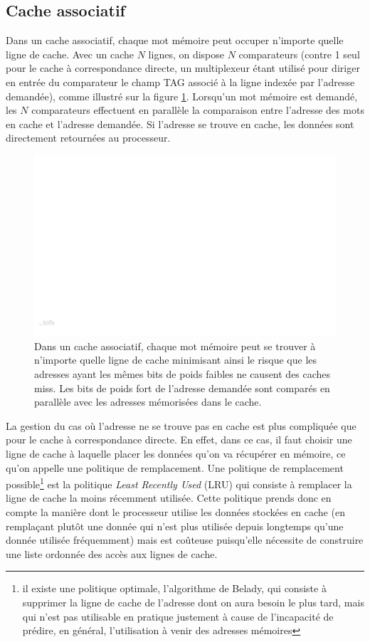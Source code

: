 \subsection{Cache associatif}

Dans un cache associatif, chaque mot mémoire peut occuper n'importe quelle ligne de cache. Avec un cache $N$ lignes, on dispose $N$ comparateurs (contre 1 seul pour le cache à correspondance directe, un multiplexeur étant utilisé pour diriger en entrée du comparateur le champ TAG associé à la ligne indexée par l'adresse demandée), comme illustré sur la figure \ref{fig:cache_associatif}. Lorsqu'un mot mémoire est demandé, les $N$ comparateurs effectuent en parallèle la comparaison entre l'adresse des mots en cache et l'adresse demandée. Si l'adresse se trouve en cache, les données sont directement retournées au processeur. 

\begin{figure}[htbp]
\centering\includegraphics[width=0.7\linewidth]{Figs/associatif_cache.pdf}
\caption{\label{fig:cache_associatif} Dans un cache associatif, chaque mot mémoire peut se trouver à n'importe quelle ligne de cache minimisant ainsi le risque que les adresses ayant les mêmes bits de poids faibles ne causent des caches miss. Les bits de poids fort de l'adresse demandée sont comparés en parallèle avec les adresses mémorisées dans le cache.}
\end{figure}

La gestion du cas o{\`u} l'adresse ne se trouve pas en cache est plus compliquée que pour le cache à correspondance directe. En effet, dans ce cas, il faut choisir une ligne de cache à laquelle placer les données qu'on va récupérer en mémoire, ce qu'on appelle une politique de remplacement. Une politique de remplacement possible\footnote{il existe une politique optimale, l'algorithme de Belady, qui consiste à supprimer la ligne de cache de l'adresse dont on aura besoin le plus tard, mais qui n'est pas utilisable en pratique justement à cause de l'incapacité de prédire, en général, l'utilisation à venir des adresses mémoires} est la politique \emph{Least Recently Used} (LRU) qui consiste à remplacer la ligne de cache la moins récemment utilisée. Cette politique prends donc en compte la manière dont le processeur utilise les données stockées en cache (en remplaçant plutôt une donnée qui n'est plus utilisée depuis longtemps qu'une donnée utilisée fréquemment) mais est coûteuse puisqu'elle nécessite de construire une liste ordonnée des accès aux lignes de cache.

